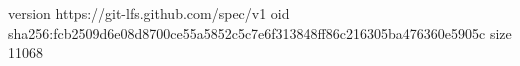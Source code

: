 version https://git-lfs.github.com/spec/v1
oid sha256:fcb2509d6e08d8700ce55a5852c5c7e6f313848ff86c216305ba476360e5905c
size 11068

